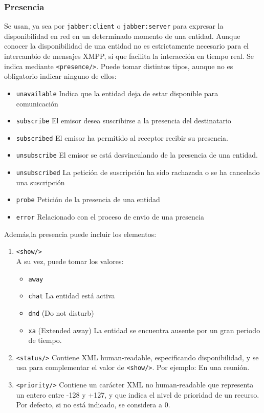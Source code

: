 \documentclass[a4paper, 11pt]{article} %
\begin{document}
    \subsubsection{Presencia}
      Se usan, ya sea por \texttt{jabber:client} o \texttt{jabber:server} para expresar la disponibilidad en red en un
      determinado momento de una entidad. Aunque conocer la disponibilidad de una entidad no es estrictamente
      necesario para el intercambio de mensajes XMPP, sí que facilita la interacción en tiempo real. Se indica 
      mediante \texttt{<presence/>}. Puede tomar distintos tipos, aunque no es obligatorio indicar ninguno de ellos:
      \begin{itemize}
      \item \texttt{unavailable} Indica que la entidad deja de estar disponible para comunicación
      \item \texttt{subscribe} El emisor desea suscribirse a la presencia del destinatario %
      \item \texttt{subscribed} El emisor ha permitido al receptor recibir su presencia.
      \item \texttt{unsubscribe} El emisor se está desvinculando de la presencia de una entidad.
      \item \texttt{unsubscribed} La petición de suscripción ha sido rachazada o se ha cancelado una suscripción
      \item \texttt{probe} Petición de la presencia de una entidad
      \item \texttt{error} Relacionado con el proceso de envio de una presencia
      \end{itemize}
      
      Además,la presencia puede incluir los elementos:
      \begin{enumerate}
      \item \texttt{<show/>}\\
      A su vez, puede tomar los valores:
      \begin{itemize}
	\item \texttt{away} 
	\item \texttt{chat} La entidad está activa
	\item \texttt{dnd} (Do not disturb)
	\item \texttt{xa} (Extended away) La entidad se encuentra ausente por un gran periodo de tiempo.
      \end{itemize}
      \item \texttt{<status/>}
      Contiene XML human-readable, especificando disponibilidad, y se usa para complementar el valor de \texttt{<show/>}.
      Por ejemplo: En una reunión.
      \item \texttt{<priority/>}
      Contiene un carácter XML no human-readable que representa un entero entre -128 y +127, y que indica el nivel
      de prioridad de un recurso. Por defecto, si no está indicado, se considera a 0.
      \end{enumerate}
\end{document}
